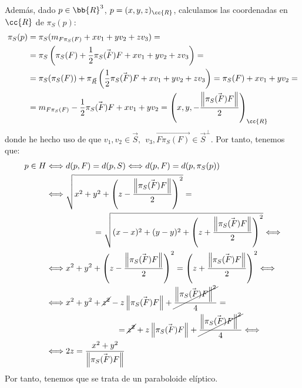 \begin{ejercicio}
    Además, dado $ p\in \bb{R}^3$, $p=(x,y,z)_{\cc{R}}$, calculamos las coordenadas en $\cc{R}$ de $\pi_S(p)$:
    \begin{align*}
        \pi_S(p) &= \pi_S(m_{F\pi_S(F)} + xv_1 + yv_2+zv_3)
        =\\&= \pi_S\left(\pi_S(F) + \frac{1}{2}\vec{\pi_S(F)F} + xv_1 + yv_2+zv_3\right)
        =\\&= \pi_S(\pi_S(F)) + \pi_{\vec{R}}\left(\frac{1}{2}\vec{\pi_S(F)F} + xv_1 + yv_2+zv_3\right) = \pi_S(F) + xv_1 + yv_2
        =\\&= m_{F\pi_S(F)} -\frac{1}{2}\vec{\pi_S(F)F} + xv_1 + yv_2
        = \left(x,y, -\dfrac{\left\|\vec{\pi_S(F)F}\right\|}{2}\right)_{\cc{R}}
    \end{align*}
    donde he hecho uso de que $v_1,v_2\in \vec{S},~~v_3, \vec{F\pi_S(F)} \in \vec{S}^\perp$. Por tanto, tenemos que:
    \begin{align*}
        p\in H &\Longleftrightarrow
        d(p,F) = d(p,S) \Longleftrightarrow d(p, F) = d(p,\pi_S(p)) \\ & \Longleftrightarrow
        \sqrt{x^2 +y^2+ \left(z-\frac{\left\|\vec{\pi_S(F)F}\right\|}{2}\right)^2} =\\&\hspace{2cm}=\sqrt{(x-x)^2 +(y-y)^2 + \left(z+\frac{\left\|\vec{\pi_S(F)F}\right\|}{2}\right)^2} \Longleftrightarrow \\ & \Longleftrightarrow
        x^2+y^2 + \left(z-\frac{\left\|\vec{\pi_S(F)F}\right\|}{2}\right)^2 = \left(z+\frac{\left\|\vec{\pi_S(F)F}\right\|}{2}\right)^2 \Longleftrightarrow \\ & \Longleftrightarrow
        x^2 +y^2 +\cancel{z^2} - z\left\|\vec{\pi_S(F)F}\right\| + \cancel{\frac{\left\|\vec{\pi_S(F)F}\right\|^2}{4}} =\\&\hspace{3cm}=\cancel{z^2} + z\left\|\vec{\pi_S(F)F}\right\| + \cancel{\frac{\left\|\vec{\pi_S(F)F}\right\|^2}{4}} \Longleftrightarrow \\ & \Longleftrightarrow
        2z = \frac{x^2+y^2}{\left\|\vec{\pi_S(F)F}\right\|}
    \end{align*}
    Por tanto, tenemos que se trata de un paraboloide elíptico.\\



\end{ejercicio}

